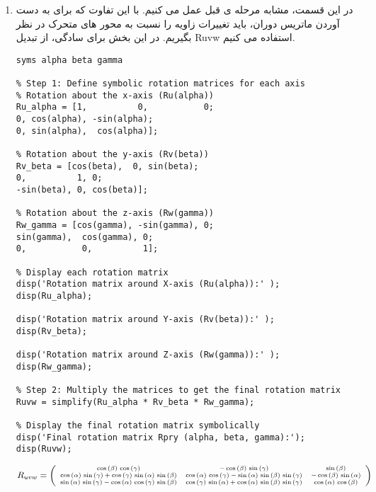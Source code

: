 \begin{enumerate}
\item 
در این قسمت، مشابه مرحله ی قبل عمل می کنیم. با این تفاوت که برای به دست آوردن ماتریس دوران، باید تغییرات زاویه را نسبت به محور های متحرک در نظر بگیریم. در این بخش برای سادگی، از تبدیل Ruvw استفاده می کنیم.
 
\begin{latin}
	\begin{lstlisting}[frame=single,style=Matlab-Pyglike]
% Define symbolic angles alpha, beta, and gamma
syms alpha beta gamma

% Step 1: Define symbolic rotation matrices for each axis
% Rotation about the x-axis (Ru(alpha))
Ru_alpha = [1,          0,           0;
0, cos(alpha), -sin(alpha);
0, sin(alpha),  cos(alpha)];

% Rotation about the y-axis (Rv(beta))
Rv_beta = [cos(beta),  0, sin(beta);
0,          1, 0;
-sin(beta), 0, cos(beta)];

% Rotation about the z-axis (Rw(gamma))
Rw_gamma = [cos(gamma), -sin(gamma), 0;
sin(gamma),  cos(gamma), 0;
0,           0,          1];

% Display each rotation matrix
disp('Rotation matrix around X-axis (Ru(alpha)):' );
disp(Ru_alpha);

disp('Rotation matrix around Y-axis (Rv(beta)):' );
disp(Rv_beta);

disp('Rotation matrix around Z-axis (Rw(gamma)):' );
disp(Rw_gamma);

% Step 2: Multiply the matrices to get the final rotation matrix
Ruvw = simplify(Ru_alpha * Rv_beta * Rw_gamma);

% Display the final rotation matrix symbolically
disp('Final rotation matrix Rpry (alpha, beta, gamma):');
disp(Ruvw);
	\end{lstlisting}
\end{latin}

\[
\scriptsize
R_{uvw} = \left(\begin{array}{ccc} 
	\cos \left(\beta \right)\,\cos \left(\gamma \right) & -\cos \left(\beta \right)\,\sin \left(\gamma \right) & \sin \left(\beta \right)\\
	\cos \left(\alpha \right)\,\sin \left(\gamma \right)+\cos \left(\gamma \right)\,\sin \left(\alpha \right)\,\sin \left(\beta \right) & \cos \left(\alpha \right)\,\cos \left(\gamma \right)-\sin \left(\alpha \right)\,\sin \left(\beta \right)\,\sin \left(\gamma \right) & -\cos \left(\beta \right)\,\sin \left(\alpha \right)\\
	\sin \left(\alpha \right)\,\sin \left(\gamma \right)-\cos \left(\alpha \right)\,\cos \left(\gamma \right)\,\sin \left(\beta \right) & \cos \left(\gamma \right)\,\sin \left(\alpha \right)+\cos \left(\alpha \right)\,\sin \left(\beta \right)\,\sin \left(\gamma \right) & \cos \left(\alpha \right)\,\cos \left(\beta \right)
\end{array}\right)
\]


\end{enumerate}
